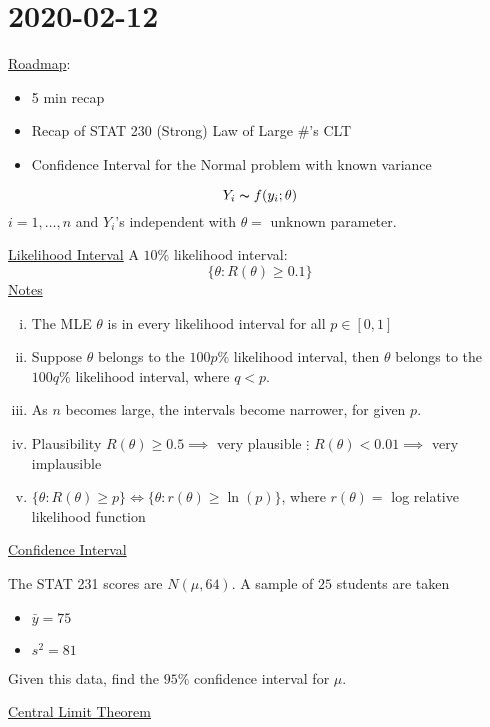 \section{2020-02-12}
\underline{Roadmap}:
\begin{itemize}
    \item 5 min recap
    \item Recap of STAT 230
          \subitem (Strong) Law of Large \#'s
          \subitem CLT
    \item Confidence Interval for the Normal problem with known variance
\end{itemize}
\[ Y_i \thicksim f(y_i;\theta) \]
$ i=1,\ldots ,n $ and $ Y_i $'s independent with $ \theta= $ unknown parameter.

\underline{Likelihood Interval}
A $ 10\% $ likelihood interval:
\[ \{\theta:R(\theta)\geqslant 0.1\} \]
\underline{Notes}
\begin{enumerate}[(i)]
    \item The MLE $ \theta $ is in every likelihood interval for all $ p\in[0,1] $
    \item Suppose $ \theta $ belongs to the $ 100p\% $ likelihood interval, then
          $ \theta $ belongs to the $ 100q\% $ likelihood interval, where $ q<p $.
    \item As $ n $ becomes large, the intervals become narrower, for given $ p $.
    \item Plausibility
          \subitem $ R(\theta)\geqslant 0.5\implies $ very plausible
          \subitem $ \vdots $
          \subitem $ R(\theta)<0.01\implies $ very implausible
    \item $ \{\theta:R(\theta)\geqslant p\}\iff \{\theta:r(\theta)\geqslant \ln(p)\} $,
          where $ r(\theta) = $ log relative likelihood function
\end{enumerate}
\underline{Confidence Interval}
\begin{exbox}
    \begin{example}
        The STAT 231 scores are $ N(\mu,64) $. A sample of $ 25 $ students are
        taken
        \begin{itemize}
            \item $ \bar{y}=75 $
            \item $ s^2=81 $
        \end{itemize}
        Given this data, find the $ 95\% $ confidence interval for $ \mu $.
    \end{example}
\end{exbox}
\underline{Central Limit Theorem}

